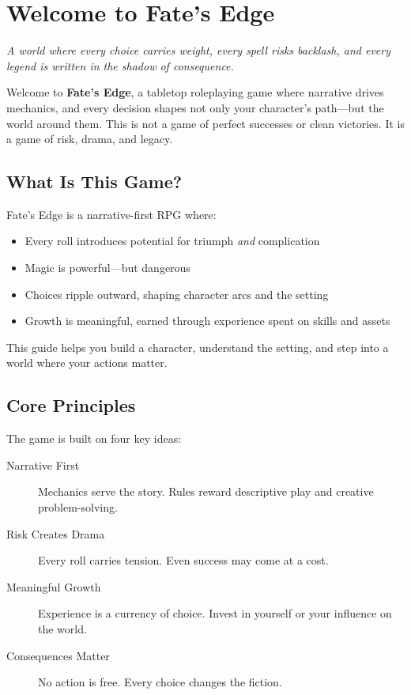 \chapter{Welcome to Fate's Edge} \label{ch:intro}

\emph{A world where every choice carries weight, every spell risks backlash, and every legend is written in the shadow of consequence.}

Welcome to \textbf{Fate's Edge}, a tabletop roleplaying game where narrative drives mechanics, and every decision shapes not only your character's path—but the world around them. This is not a game of perfect successes or clean victories. It is a game of risk, drama, and legacy.

\section*{What Is This Game?} 

Fate's Edge is a narrative-first RPG where: 
\begin{itemize} 
\item Every roll introduces potential for triumph \emph{and} complication 
\item Magic is powerful—but dangerous 
\item Choices ripple outward, shaping character arcs and the setting 
\item Growth is meaningful, earned through experience spent on skills and assets 
\end{itemize}

This guide helps you build a character, understand the setting, and step into a world where your actions matter.

\section*{Core Principles} 

The game is built on four key ideas:

\begin{description} 
\item[Narrative First] Mechanics serve the story. Rules reward descriptive play and creative problem-solving. 
\item[Risk Creates Drama] Every roll carries tension. Even success may come at a cost. 
\item[Meaningful Growth] Experience is a currency of choice. Invest in yourself or your influence on the world. 
\item[Consequences Matter] No action is free. Every choice changes the fiction. 
\end{description}

